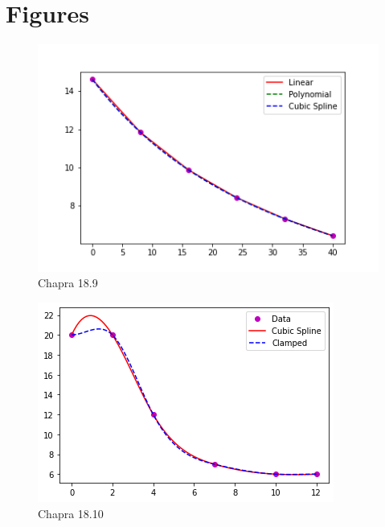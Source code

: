 \documentclass{article}
\begin{document}
\section{Figures}
\begin{figure}[h!]
\begin{center}
\includegraphics{chapra_18_009.png}
\caption{Chapra 18.9}
\end{center}
\end{figure}

\begin{figure}[h!]
\begin{center}
\includegraphics{chapra_18_010.png}
\caption{Chapra 18.10}
\end{center}
\end{figure}
\end{document}
